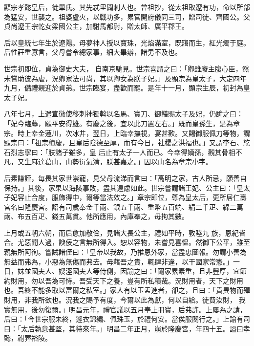 \begin{pinyinscope}
 顯宗孝懿皇后，徒單氏。其先忒里闢刺人也。曾祖抄，從太祖取遼有功，命以所部為猛安，世襲之。祖婆盧火，以戰功多，累官開府儀同三司，贈司徒、齊國公。父貞尚遼王宗乾女梁國公主，加駙馬都尉，贈太師、廣平郡王。



 后以皇統七年生於遼陽。母夢神人授以寶珠，光焰滿室，既寤而生，紅光燭于庭。后性莊重寡言，父母嘗令總家事，細大畢辦，諸男不及也。



 世宗初即位，貞為御史大夫，
 自南京馳見。世宗喜謂之曰：「卿雖廢主腹心臣，然未嘗助彼為虐，況卿家法可尚，其以卿女為朕子妃。」及顯宗為皇太子，大定四年九月，備禮親迎於貞弟。世宗臨宴，盡歡而罷。是年十一月，顯宗生辰，初封為皇太子妃。



 八年七月，上遣宣徽使移刺神獨斡以名馬、寶刀、御饍賜太子及妃，仍諭之曰：「妃今臨蓐，願平安得雄。有慶之後，宜以此刀置左右。」既而皇孫生，是為章宗。時上幸金蓮川，次冰井，翌日，上臨幸撫視，宴甚歡。又賜御服佩刀等物，謂顯宗曰：「祖宗積慶，且皇后陰德至厚，而有今日，社稷之洪福也。」又謂李石、紇石烈志寧曰：「朕諸子雖多，皇
 后止有太子一人而已。今幸得嫡孫，觀其骨相不凡，又生麻達葛山，山勢衍氣清，朕甚嘉之。」因以山名為章宗小字。



 后素謙謹，每畏其家世崇寵，見父母流涕而言曰：「高明之家，古人所忌，願善自保持。」其後，家果以海陵事敗，盡其遠慮如此。世宗嘗謂諸王妃、公主曰：「皇太子妃容止合度，服飾得中，爾等當法效之。」章宗即位，尊為皇太后，更所居仁壽宮名曰隆慶宮。詔有司歲奉金千兩、銀五千兩、重幣五百端、絹二千疋、綿二萬兩、布五百疋、錢五萬貫。他所應用，內庫奉之，毋拘其數。



 上月或五朝六朝，而后愈加敬儉，見諸大長公主，禮如平時，敦睦九
 族，恩紀皆合。尤惡聞人過，諛佞之言無所得入。恕以容物，未嘗見喜慍。然御下公平，雖至親無所阿徇。嘗誡諸侄曰：「皇帝以我故，乃推恩外家，當盡忠圖報。勿謂小善為無益而弗為，小惡為無傷而弗去。毋藉吾之貴，輒肆非違，以干國家常憲。」一日，妹並國夫人、嫂涇國夫人等侍側，因諭之曰：「爾家累素重，且非豐厚，宜節約財用，勿以吾為可恃。吾受天下之養，豈有所私積哉。況財用者，天下之財用也。吾終不能多取以富爾之私室。」家人有以玉盂進者，卻之，且曰：「貴異物而殫財用，非我所欲也。況我之賜予有度，今爾以此為獻，何以自給。徒費汝財，
 我實無用，後勿復爾。」明昌元年，禮官議以五月奉上冊寶，后弗許。上屢為之請，后曰：「今世宗服未終，遽衣錦繡、佩珠玉，於禮何安。當俟服闋行之。」上諭有司曰：「太后執意甚堅，其待來年。」明昌二年正月，崩於隆慶宮，年四十五。謚曰孝懿，祔葬裕陵。




\end{pinyinscope}
